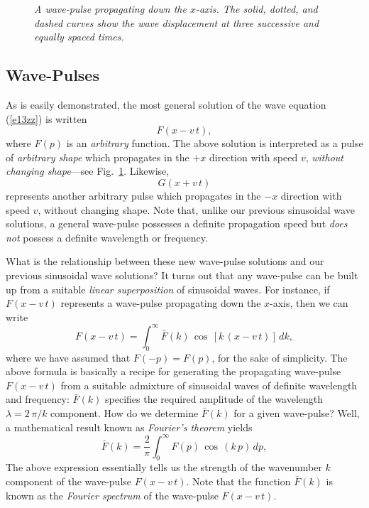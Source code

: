 \begin{figure}
\epsfysize=2.5in
\centerline{}
\caption{\em A wave-pulse propagating down the $x$-axis. The solid, dotted, and dashed
curves show the wave displacement at three successive and equally spaced
times.}\label{f110}  
\end{figure}

\subsection{Wave-Pulses}
As is easily demonstrated, the most general solution of the wave equation (\ref{e13zz}) is written
\begin{equation}
F (x - v\,t),
\end{equation}
where $F(p)$ is an {\em arbitrary} function. The above solution is interpreted
as a pulse of {\em arbitrary shape} which propagates in the $+x$ direction with
speed $v$, {\em without changing shape}---see Fig.~\ref{f110}. Likewise,
\begin{equation}
G (x + v\,t)
\end{equation}
represents  another arbitrary pulse  which propagates in the $-x$ direction with
speed $v$, without changing shape. Note that, unlike our previous sinusoidal wave solutions,
a general wave-pulse possesses a definite propagation speed but  {\em does not} possess
a definite wavelength or frequency.

What is the relationship between these new wave-pulse solutions and our previous
sinusoidal wave solutions? It turns out that any wave-pulse can be built up from
a suitable {\em linear superposition} of sinusoidal waves. For instance,
if $F(x-v\,t)$ represents a wave-pulse propagating down the $x$-axis, then
we can write
\begin{equation}
F (x-v\,t) = \int_0^\infty \bar{F}(k)\,\cos\,[k\,(x-v\, t)]\,dk,
\end{equation}
where we have assumed that $F(-p)=F(p)$, for the sake of simplicity. The above
formula is basically a recipe for generating the propagating wave-pulse $F(x-v\,t)$ 
from a suitable admixture of sinusoidal waves of definite wavelength and frequency:
$\bar{F}(k)$ specifies the required amplitude of the wavelength $\lambda =2\,\pi/k$
component. How do we determine $\bar{F}(k)$ for a given wave-pulse? Well, a
mathematical result known as {\em Fourier's theorem} yields
\begin{equation}
\bar{F} (k) = \frac{2}{\pi}\int_0^\infty F(p)\,\cos\,(k\,p)\,dp,
\end{equation}
The above expression essentially tells us the strength of the wavenumber $k$ component
of the wave-pulse  $F(x-v\,t)$. Note that the function $\bar{F}(k)$ is known as the
{\em Fourier spectrum} of the wave-pulse $F(x-v\,t)$. 

